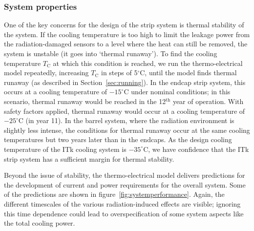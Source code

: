 \subsubsection{System properties}
One of the key concerns for the design of the strip system is thermal stability of the system. If the cooling temperature is too high to limit the leakage power from the radiation-damaged sensors to a level where the heat can still be removed, the system is unstable (it goes into `thermal runaway').
To find the cooling temperature $T_\text{C}$ at which this condition is reached, we run the thermo-electrical model repeatedly, increasing $T_\text{C}$ in steps of 5$^\circ$C, until the model finds thermal runaway (as described in Section~\ref{sec:running}). In the endcap strip system, this occurs at a cooling temperature of $-15^\circ$C under nominal conditions; in this scenario, thermal runaway would be reached in the 12$^\text{th}$ year of operation. With safety factors applied, thermal runaway would occur at a cooling temperature of $-25^\circ$C (in year 11).
In the barrel system, where the radiation environment is slightly less intense, the conditions for thermal runaway occur at the same cooling temperatures but two years later than in the endcaps.
As the design cooling temperature of the ITk cooling system is $-35^\circ$C, we have confidence that the ITk strip system has a sufficient margin for thermal stability.

Beyond the issue of stability, the thermo-electrical model delivers predictions for the development of current and power requirements for the overall system. Some of the predictions are shown in figure~\ref{fig:systemperformance}. Again, the different timescales of the various radiation-induced effects are visible; ignoring this time dependence could lead to overspecification of some system aspects like the total cooling power.

